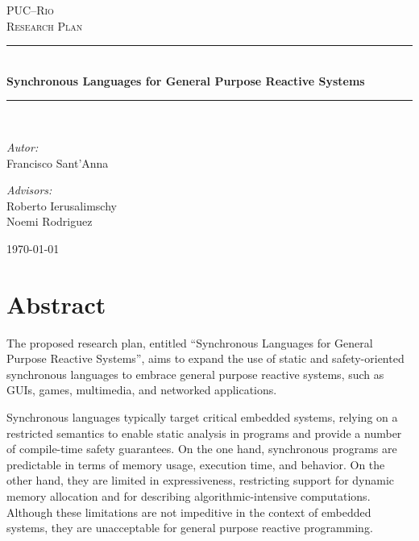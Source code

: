\documentclass[pdftex,12pt,a4paper]{article}
\begin{document}
\begin{titlepage}
\begin{center}

\textsc{\LARGE PUC--Rio}\\[1.5cm]
\textsc{\Large Research Plan}\\[0.8cm]

\newcommand{\HRule}{\rule{\linewidth}{0.5mm}}
\HRule \\[0.4cm]
{ \huge \bfseries Synchronous Languages for
                  General Purpose Reactive Systems }\\[0.4cm]
\HRule \\[1.5cm]

\begin{minipage}{0.4\textwidth}
\begin{flushleft} \large
\emph{Autor:}\\
Francisco Sant'Anna
\end{flushleft}
\end{minipage}
\begin{minipage}{0.4\textwidth}
\begin{flushright} \large
\emph{Advisors:} \\
Roberto Ierusalimschy \\
Noemi Rodriguez
\end{flushright}
\end{minipage}

\vfill
{\large \today}
\end{center}
\end{titlepage}

\tableofcontents

\newpage
\section{Abstract}

The proposed research plan, entitled ``Synchronous Languages for General 
Purpose Reactive Systems'', aims to expand the use of static and 
safety-oriented synchronous languages to embrace general purpose reactive 
systems, such as GUIs, games, multimedia, and networked applications.

Synchronous languages typically target critical embedded systems, relying on a 
restricted semantics to enable static analysis in programs and provide a number 
of compile-time safety guarantees.
%
On the one hand, synchronous programs are predictable in terms of memory usage, 
execution time, and behavior.
%
On the other hand, they are limited in expressiveness, restricting support for 
dynamic memory allocation and for describing algorithmic-intensive 
computations.
%
Although these limitations are not impeditive in the context of embedded 
systems, they are unacceptable for general purpose reactive programming.
\end{document}
